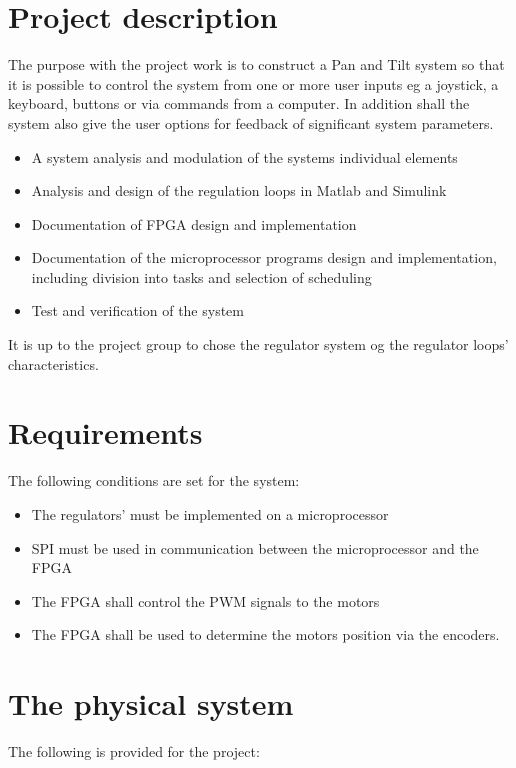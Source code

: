 \section{Project description}
The purpose with the project work is to construct a Pan and Tilt system so that it is possible to control the system from one or more user inputs eg a joystick, a keyboard, buttons or via commands from a computer. In addition shall the system also give the user options for feedback of significant system parameters.

\begin{itemize}
\item A system analysis and modulation of the systems individual elements
\item Analysis and design of the regulation loops in Matlab and Simulink
\item Documentation of FPGA design and implementation
\item Documentation of the microprocessor programs design and implementation, including division into tasks and selection of scheduling
\item Test and verification of the system
\end{itemize}

It is up to the project group to chose the regulator system og the regulator loops' characteristics.

\section{Requirements}

The following conditions are set for the system:
\begin{itemize}
\item The regulators' must be implemented on a microprocessor
\item SPI must be used in communication between the microprocessor and the FPGA
\item The FPGA shall control the PWM signals to the motors
\item The FPGA shall be used to determine the motors position via the encoders.
\end{itemize}

\section{The physical system}

The following is provided for the project:

